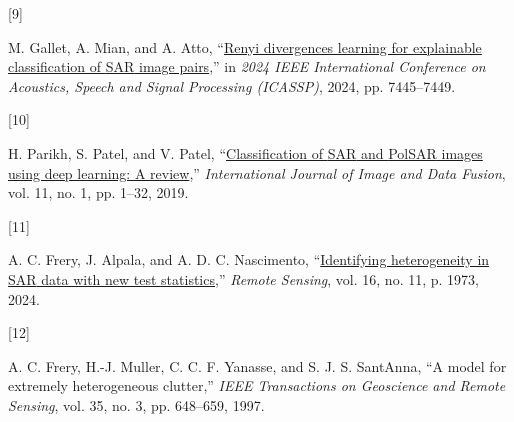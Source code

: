 \documentclass[
  lettersize  journal,
]{IEEEtran}%
\newlength{\cslhangindent}
\newlength{\csllabelwidth}
\newenvironment{CSLReferences}[2] %
 {\begin{list}{}{%
  \setlength{\itemindent}{0pt}
  \setlength{\leftmargin}{0pt}
  \setlength{\parsep}{0pt}
  \ifodd #1
   \setlength{\leftmargin}{\cslhangindent}
   \setlength{\itemindent}{-1\cslhangindent}
  \fi
  \setlength{\itemsep}{#2\baselineskip}}}
 {\end{list}}
\newcommand{\CSLLeftMargin}[1]{\parbox[t]{\csllabelwidth}{\strut#1\strut}}
\newcommand{\CSLRightInline}[1]{\parbox[t]{\linewidth - \csllabelwidth}{\strut#1\strut}}
\providecommand{\DIFaddbegin}{} %
\providecommand{\DIFaddend}{} %
\providecommand{\DIFdelbegin}{} %
\providecommand{\DIFdelend}{} %
\newcommand{\DIFscaledelfig}{0.5}
\newlength{\DIFdelgraphicswidth} %
\newlength{\DIFdelgraphicsheight} %
\newcommand{\DIFaddincludegraphics}[2][]{{\color{blue}\fbox{\DIFOincludegraphics[#1]{#2}}}} %
\newcommand{\DIFdelincludegraphics}[2][]{%
\sbox{\DIFdelgraphicsbox}{\DIFOincludegraphics[#1]{#2}}%
\settoboxwidth{\DIFdelgraphicswidth}{\DIFdelgraphicsbox} %
\settoboxtotalheight{\DIFdelgraphicsheight}{\DIFdelgraphicsbox} %
\scalebox{\DIFscaledelfig}{%
\parbox[b]{\DIFdelgraphicswidth}{\usebox{\DIFdelgraphicsbox}\\[-\baselineskip] \rule{\DIFdelgraphicswidth}{0em}}\llap{\resizebox{\DIFdelgraphicswidth}{\DIFdelgraphicsheight}{%
\setlength{\unitlength}{\DIFdelgraphicswidth}%
\begin{picture}(1,1)%
\thicklines\linethickness{2pt} %
{\color[rgb]{1,0,0}\put(0,0){\framebox(1,1){}}}%
{\color[rgb]{1,0,0}\put(0,0){\line( 1,1){1}}}%
{\color[rgb]{1,0,0}\put(0,1){\line(1,-1){1}}}%
\end{picture}%
}\hspace*{3pt}}} %
} %
\DeclareRobustCommand{\DIFaddbegin}{\DIFOaddbegin \let\includegraphics\DIFaddincludegraphics} %
\DeclareRobustCommand{\DIFaddend}{\DIFOaddend \let\includegraphics\DIFOincludegraphics} %
\DeclareRobustCommand{\DIFdelbegin}{\DIFOdelbegin \let\includegraphics\DIFdelincludegraphics} %
\DeclareRobustCommand{\DIFdelend}{\DIFOaddend \let\includegraphics\DIFOincludegraphics} %
\begin{document}
\begin{CSLReferences}{0}{0}
\DIFdelbegin {}
\DIFdelend \DIFaddbegin {}
\DIFaddend \CSLLeftMargin{{[}9{]} }%
\DIFdelbegin %
\DIFdelend \DIFaddbegin \CSLRightInline{M. Gallet, A. Mian, and A. Atto,
{``\href{https://doi.org/10.1109/icassp48485.2024.10448227}{Renyi
divergences learning for explainable classification of {SAR} image
pairs},''} in \emph{2024 {IEEE} {I}nternational {C}onference on
{A}coustics, {S}peech and {S}ignal {P}rocessing {(ICASSP)}}, 2024, pp.
7445--7449. }
\DIFaddend 

\DIFdelbegin {}
\DIFdelend \DIFaddbegin {}
\DIFaddend \CSLLeftMargin{{[}10{]} }%
\DIFdelbegin %
\DIFdelend \DIFaddbegin \CSLRightInline{H. Parikh, S. Patel, and V. Patel,
{``\href{https://doi.org/10.1080/19479832.2019.1655489}{Classification
of {SAR} and {PolSAR} images using deep learning: A review},''}
\emph{International Journal of Image and Data Fusion}, vol. 11, no. 1,
pp. 1--32, 2019. }
\DIFaddend 

\DIFdelbegin {}
\DIFdelend \DIFaddbegin {}
\DIFaddend \CSLLeftMargin{{[}11{]} }%
\DIFdelbegin %
\DIFdelend \DIFaddbegin \CSLRightInline{A. C. Frery, J. Alpala, and A. D. C. Nascimento,
{``\href{https://doi.org/10.3390/rs16111973}{Identifying heterogeneity
in {SAR} data with new test statistics},''} \emph{Remote Sensing}, vol.
16, no. 11, p. 1973, 2024. }
\DIFaddend 

\DIFdelbegin {}
\DIFdelend \DIFaddbegin {}
\DIFaddend \CSLLeftMargin{{[}12{]} }%
\DIFdelbegin %
\DIFdelend \DIFaddbegin \CSLRightInline{A. C. Frery, H.-J. Muller, C. C. F. Yanasse, and S. J.
S. SantAnna, {``A model for extremely heterogeneous clutter,''}
\emph{{IEEE} Transactions on Geoscience and Remote Sensing}, vol. 35,
no. 3, pp. 648--659, 1997. }
\DIFaddend 


\end{CSLReferences}
\end{document}
